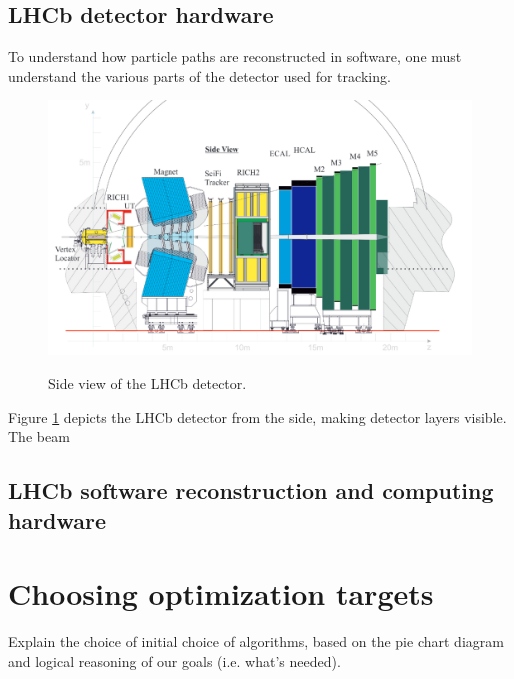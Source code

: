 \documentclass[12pt]{article}
\begin{document}
	
	\subsection{LHCb detector hardware}
	
	To understand how particle paths are reconstructed in software, one must understand the various parts of the detector used for tracking.
	
	\begin{figure}[H]
		\includegraphics[width=\textwidth]{lhcb_geometry_upgrade}
		\label{fig_lhcb_geometry}
		\caption{Side view of the LHCb detector.}
	\end{figure}

	Figure \ref{fig_lhcb_geometry} depicts the LHCb detector from the side, making detector layers visible. The beam 
	
	\subsection{LHCb software reconstruction and computing hardware}
	
	\section{Choosing optimization targets}
	
	\color{red}
	Explain the choice of initial choice of algorithms, based on the pie chart diagram and logical reasoning of our goals (i.e. what's needed).	
	\color{black}
	
\end{document}
